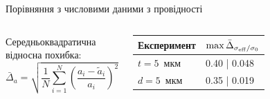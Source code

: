 \documentclass[10pt]{beamer}
\begin{document}
\begin{frame}{Порівняння з числовими даними з провідності}
\begin{columns}[T,onlytextwidth]
      \vspace{10pt}
      Середньоквадратична відносна похибка:
      $$
        \bar{\Delta}_a = \sqrt{\frac{1}{N}\sum\limits_{i=1}^N \left( \frac{a_i - \tilde{a}_i}{a_i} \right)^2}
      $$

      \begin{table}
        \begin{tabular}{ll}
          \toprule
          Експеримент & $\max \bar{\Delta}_{\sigma_{\rm eff}/\sigma_0}$\\
          \midrule
          $t=5$~мкм & 0.40 | 0.048\\
          $d=5$~мкм & 0.35 | 0.019\\
          \bottomrule
        \end{tabular}
      \end{table}
\end{columns}
\end{frame}
\end{document}

